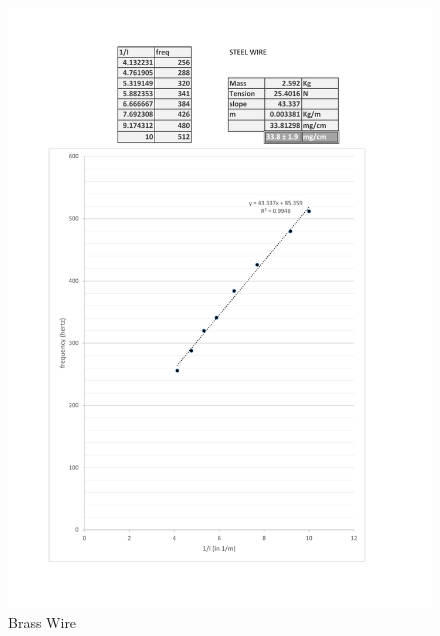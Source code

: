 	\begin{figure}[bth]
		\begin{center}
			\includegraphics[width=1.3\linewidth]{gfx/steel}
		\end{center}
		\caption[Brass Wire]{Brass Wire}
	\label{4_steel}
	\end{figure}

